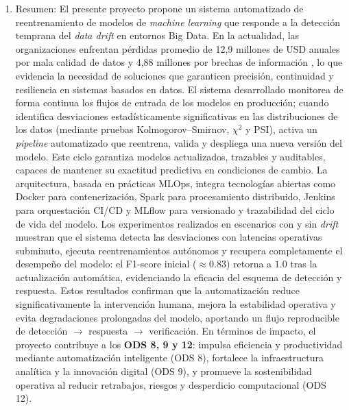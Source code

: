 \begin{enumerate}
    \item Resumen:  El presente proyecto propone un sistema automatizado de reentrenamiento de modelos de \textit{machine learning} que responde a la detección temprana del \textit{data drift} en entornos Big Data. En la actualidad, las organizaciones enfrentan pérdidas promedio de 12{,}9 millones de USD anuales por mala calidad de datos y 4{,}88 millones por brechas de información \citep{Gartner2024,IBM2024}, lo que evidencia la necesidad de soluciones que garanticen precisión, continuidad y resiliencia en sistemas basados en datos. El sistema desarrollado monitorea de forma continua los flujos de entrada de los modelos en producción; cuando identifica desviaciones estadísticamente significativas en las distribuciones de los datos (mediante pruebas Kolmogorov--Smirnov, $\chi^2$ y PSI), activa un \textit{pipeline} automatizado que reentrena, valida y despliega una nueva versión del modelo. Este ciclo garantiza modelos actualizados, trazables y auditables, capaces de mantener su exactitud predictiva en condiciones de cambio. La arquitectura, basada en prácticas MLOps, integra tecnologías abiertas como Docker para contenerización, Spark para procesamiento distribuido, Jenkins para orquestación CI/CD y MLflow para versionado y trazabilidad del ciclo de vida del modelo. Los experimentos realizados en escenarios con y sin \textit{drift} muestran que el sistema detecta las desviaciones con latencias operativas subminuto, ejecuta reentrenamientos autónomos y recupera completamente el desempeño del modelo: el F1-score inicial ($\approx 0.83$) retorna a $1.0$ tras la actualización automática, evidenciando la eficacia del esquema de detección y respuesta. Estos resultados confirman que la automatización reduce significativamente la intervención humana, mejora la estabilidad operativa y evita degradaciones prolongadas del modelo, aportando un flujo reproducible de detección $\rightarrow$ respuesta $\rightarrow$ verificación. En términos de impacto, el proyecto contribuye a los \textbf{ODS 8, 9 y 12}: impulsa eficiencia y productividad mediante automatización inteligente (ODS 8), fortalece la infraestructura analítica y la innovación digital (ODS 9), y promueve la sostenibilidad operativa al reducir retrabajos, riesgos y desperdicio computacional (ODS 12).
\end{enumerate}
